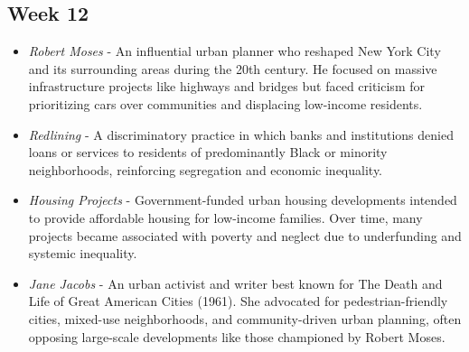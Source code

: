 \documentclass[12pt]{article}
\begin{document}
\subsection*{Week 12}

\begin{itemize}
    \item\textit{Robert Moses} - An influential urban planner who reshaped New York City and its surrounding areas during the 20th century. He focused on massive infrastructure projects like highways and bridges but faced criticism for prioritizing cars over communities and displacing low-income residents.
    
    \item\textit{Redlining} - A discriminatory practice in which banks and institutions denied loans or services to residents of predominantly Black or minority neighborhoods, reinforcing segregation and economic inequality.
    
    \item\textit{Housing Projects} - Government-funded urban housing developments intended to provide affordable housing for low-income families. Over time, many projects became associated with poverty and neglect due to underfunding and systemic inequality.
    
    \item\textit{Jane Jacobs} - An urban activist and writer best known for The Death and Life of Great American Cities (1961). She advocated for pedestrian-friendly cities, mixed-use neighborhoods, and community-driven urban planning, often opposing large-scale developments like those championed by Robert Moses.
\end{itemize}
    
\end{document}
